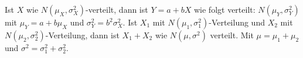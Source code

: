 \begin{onehalfspace}
Ist $X$ wie $N(\mu _X, \sigma _X^2)$-verteilt, dann ist $Y = a+bX$ wie folgt verteilt: $N(\mu _Y, \sigma _Y^2)$ mit $\mu _Y = a + b\mu _X$ und $\sigma _Y^2 = b^2 \sigma _X^2$. Ist $X_1$ mit $N(\mu _1, \sigma _1^2)$-Verteilung und $X_2$ mit $N(\mu _2, \sigma _2^2)$-Verteilung, dann ist $X_1 + X_2$ wie $N(\mu, \sigma ^2)$ verteilt. Mit $\mu = \mu _1 + \mu _2$ und $\sigma ^2 = \sigma _1^2 + \sigma _2^2$.
\end{onehalfspace}
